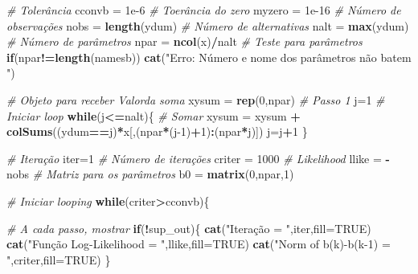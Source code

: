 \documentclass[12pt,a4paper]{article}
\newenvironment{Shaded}{\begin{snugshade}}{\end{snugshade}}
\newcommand{\CommentTok}[1]{\textcolor[rgb]{0.56,0.35,0.01}{\textit{#1}}}
\newcommand{\ControlFlowTok}[1]{\textcolor[rgb]{0.13,0.29,0.53}{\textbf{#1}}}
\newcommand{\DataTypeTok}[1]{\textcolor[rgb]{0.13,0.29,0.53}{#1}}
\newcommand{\DecValTok}[1]{\textcolor[rgb]{0.00,0.00,0.81}{#1}}
\newcommand{\FloatTok}[1]{\textcolor[rgb]{0.00,0.00,0.81}{#1}}
\newcommand{\KeywordTok}[1]{\textcolor[rgb]{0.13,0.29,0.53}{\textbf{#1}}}
\newcommand{\NormalTok}[1]{#1}
\newcommand{\OperatorTok}[1]{\textcolor[rgb]{0.81,0.36,0.00}{\textbf{#1}}}
\newcommand{\OtherTok}[1]{\textcolor[rgb]{0.56,0.35,0.01}{#1}}
\newcommand{\StringTok}[1]{\textcolor[rgb]{0.31,0.60,0.02}{#1}}
\begin{document}
\begin{Shaded}
\begin{Highlighting}[]
{{{{  \CommentTok{# Tolerância}
\NormalTok{  cconvb =}\StringTok{ }\FloatTok{1e-6}
  \CommentTok{# Toerância do zero}
\NormalTok{  myzero =}\StringTok{ }\FloatTok{1e-16}
  \CommentTok{# Número de observações}
\NormalTok{  nobs =}\StringTok{ }\KeywordTok{length}\NormalTok{(ydum)}
  \CommentTok{# Número de alternativas}
\NormalTok{  nalt =}\StringTok{ }\KeywordTok{max}\NormalTok{(ydum)}
  \CommentTok{# Número de parâmetros}
\NormalTok{  npar =}\StringTok{ }\KeywordTok{ncol}\NormalTok{(x)}\OperatorTok{/}\NormalTok{nalt}
  \CommentTok{# Teste para parâmetros}
  \ControlFlowTok{if}\NormalTok{(npar}\OperatorTok{!=}\KeywordTok{length}\NormalTok{(namesb)) }
    \KeywordTok{cat}\NormalTok{(}\StringTok{"Erro: Número e nome dos parâmetros não batem "}\NormalTok{)}
  
  \CommentTok{# Objeto para receber Valorda soma}
\NormalTok{  xysum =}\StringTok{ }\KeywordTok{rep}\NormalTok{(}\DecValTok{0}\NormalTok{,npar)}
  \CommentTok{# Passo 1}
\NormalTok{  j=}\DecValTok{1}
  \CommentTok{# Iniciar loop}
  \ControlFlowTok{while}\NormalTok{(j}\OperatorTok{<=}\NormalTok{nalt)\{}
    \CommentTok{# Somar}
\NormalTok{    xysum =}\StringTok{ }\NormalTok{xysum }\OperatorTok{+}\StringTok{ }\KeywordTok{colSums}\NormalTok{((ydum}\OperatorTok{==}\NormalTok{j)}\OperatorTok{*}\NormalTok{x[,(npar}\OperatorTok{*}\NormalTok{(j}\DecValTok{-1}\NormalTok{)}\OperatorTok{+}\DecValTok{1}\NormalTok{)}\OperatorTok{:}\NormalTok{(npar}\OperatorTok{*}\NormalTok{j)])}
\NormalTok{    j=j}\OperatorTok{+}\DecValTok{1}
\NormalTok{  \}}
  
  \CommentTok{# Iteração}
\NormalTok{  iter=}\DecValTok{1}
  \CommentTok{# Número de iterações}
\NormalTok{  criter =}\StringTok{ }\DecValTok{1000}
  \CommentTok{# Likelihood}
\NormalTok{  llike =}\StringTok{ }\OperatorTok{-}\NormalTok{nobs}
  \CommentTok{# Matriz para os parâmetros}
\NormalTok{  b0 =}\StringTok{ }\KeywordTok{matrix}\NormalTok{(}\DecValTok{0}\NormalTok{,npar,}\DecValTok{1}\NormalTok{)}
  
  \CommentTok{# Iniciar looping}
  \ControlFlowTok{while}\NormalTok{(criter}\OperatorTok{>}\NormalTok{cconvb)\{}
    
    \CommentTok{# A cada passo, mostrar}
    \ControlFlowTok{if}\NormalTok{(}\OperatorTok{!}\NormalTok{sup_out)\{}
      \KeywordTok{cat}\NormalTok{(}\StringTok{"Iteração                = "}\NormalTok{,iter,}\DataTypeTok{fill=}\OtherTok{TRUE}\NormalTok{)}
      \KeywordTok{cat}\NormalTok{(}\StringTok{"Função Log-Likelihood  = "}\NormalTok{,llike,}\DataTypeTok{fill=}\OtherTok{TRUE}\NormalTok{)}
      \KeywordTok{cat}\NormalTok{(}\StringTok{"Norm of b(k)-b(k-1)      = "}\NormalTok{,criter,}\DataTypeTok{fill=}\OtherTok{TRUE}\NormalTok{)}
\NormalTok{    \}}
    
}}}}
\end{Highlighting}
\end{Shaded}
\end{document}
